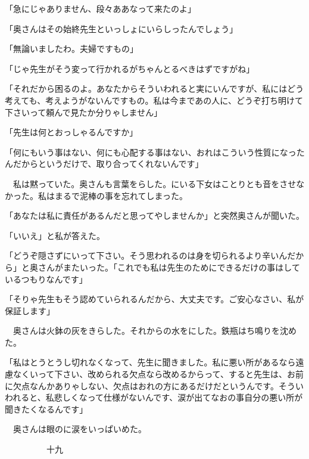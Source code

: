 \documentclass[a4j,onecolumn]{tarticle}
\begin{document}
「急にじゃありません、\hbox{}段々ああなって来たのよ」\par{}
「奥さんはその始終先生といっしょにいらしったんでしょう」\par{}
「無論いましたわ。\hbox{}夫婦ですもの」\par{}
「じゃ先生がそう変って行かれるがちゃんとるべきはずですがね」\par{}
「それだから困るのよ。\hbox{}あなたからそういわれると実にいんですが、\hbox{}私にはどう考えても、\hbox{}考えようがないんですもの。\hbox{}私は今まであの人に、\hbox{}どうぞ打ち明けて下さいって頼んで見たか分りゃしません」\par{}
「先生は何とおっしゃるんですか」\par{}
「何にもいう事はない、\hbox{}何にも心配する事はない、\hbox{}おれはこういう性質になったんだからというだけで、\hbox{}取り合ってくれないんです」\par{}
　私は黙っていた。\hbox{}奥さんも言葉をらした。\hbox{}にいる下女はことりとも音をさせなかった。\hbox{}私はまるで泥棒の事を忘れてしまった。\hbox{}\par{}
「あなたは私に責任があるんだと思ってやしませんか」と突然奥さんが聞いた。\hbox{}\par{}
「いいえ」と私が答えた。\hbox{}\par{}
「どうぞ隠さずにいって下さい。\hbox{}そう思われるのは身を切られるより辛いんだから」と奥さんがまたいった。\hbox{}「これでも私は先生のためにできるだけの事はしているつもりなんです」\par{}
「そりゃ先生もそう認めていられるんだから、\hbox{}大丈夫です。\hbox{}ご安心なさい、\hbox{}私が保証します」\par{}
　奥さんは火鉢の灰をきらした。\hbox{}それからの水をにした。\hbox{}鉄瓶はち鳴りを沈めた。\hbox{}\par{}
「私はとうとうし切れなくなって、\hbox{}先生に聞きました。\hbox{}私に悪い所があるなら遠慮なくいって下さい、\hbox{}改められる欠点なら改めるからって、\hbox{}すると先生は、\hbox{}お前に欠点なんかありゃしない、\hbox{}欠点はおれの方にあるだけだというんです。\hbox{}そういわれると、\hbox{}私悲しくなって仕様がないんです、\hbox{}涙が出てなおの事自分の悪い所が聞きたくなるんです」\par{}
　奥さんは眼のに涙をいっぱいめた。\hbox{}\par{}\par{}　　　　　十九
\end{document}

